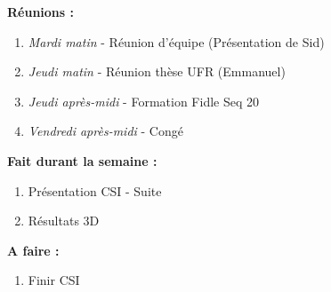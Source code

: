 \textbf{Réunions :}
\begin{enumerate}[label=\textbullet]
	\item \textit{Mardi matin} - Réunion d'équipe (Présentation de Sid)
	\item \textit{Jeudi matin} - Réunion thèse UFR (Emmanuel)
	\item \textit{Jeudi après-midi} - Formation Fidle Seq 20
	\item \textit{Vendredi après-midi} - Congé
\end{enumerate}
\textbf{Fait durant la semaine :}
\begin{enumerate}[label=\textbullet]
	\item Présentation CSI - Suite
	\item Résultats 3D
\end{enumerate}
\textbf{A faire :}
\begin{enumerate}[label=\textbullet]
	\item Finir CSI
\end{enumerate}